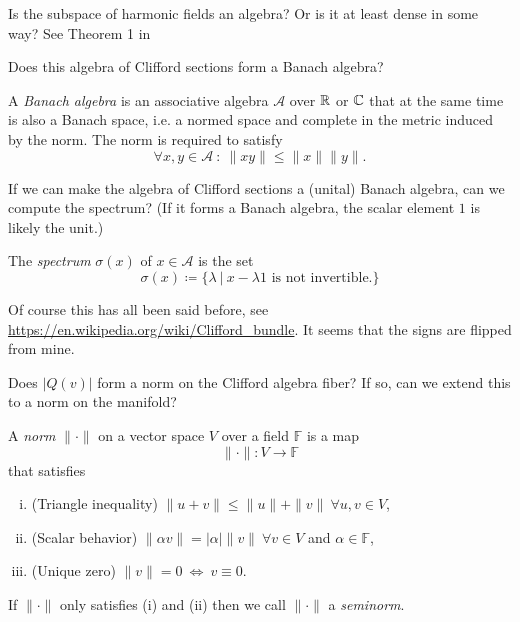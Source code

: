 \begin{question}
Is the subspace of harmonic fields an algebra? Or is it at least dense in some way? See Theorem 1 in \cite{belishev_quaternion}
\end{question}

\begin{question}
Does this algebra of Clifford sections form a Banach algebra?
\end{question}

\begin{definition}
A \emph{Banach algebra} is an associative algebra $\mathcal{A}$ over $\mathbb{R}$ or $\mathbb{C}$ that at the same time is also a Banach space, i.e. a normed space and complete in the metric induced by the norm. The norm is required to satisfy
\[
\forall x,y \in \mathcal{A}~\colon~ \|xy\|\leq \|x\|\|y\|.
\]
\end{definition}

\begin{question}
If we can make the algebra of Clifford sections a (unital) Banach algebra, can we compute the spectrum? (If it forms a Banach algebra, the scalar element $1$ is likely the unit.)
\end{question}

\begin{definition}
The \emph{spectrum} $\sigma(x)$ of $x\in \mathcal{A}$ is the set
\[
\sigma(x) \coloneqq \{ \lambda ~\vert~ x-\lambda 1 \textrm{ is not invertible.}\}
\]
\end{definition}

Of course this has all been said before, see \url{https://en.wikipedia.org/wiki/Clifford_bundle}. It seems that the signs are flipped from mine.

\begin{question}
Does $|Q(v)|$ form a norm on the Clifford algebra fiber? If so, can we extend this to a norm on the manifold?
\end{question}

\begin{definition}
A \emph{norm} $\|\cdot\|$ on a vector space $V$ over a field $\mathbb{F}$ is a map
\[
\|\cdot \| \colon V \to \mathbb{F}
\]
that satisfies
\begin{enumerate}[(i)]
    \item (Triangle inequality) $\|u+v\|\leq \|u\|+\|v\|~\forall u,v\in V$,
    \item (Scalar behavior) $\|\alpha v\| = |\alpha|\|v\|~\forall v\in V$ and $\alpha \in \mathbb{F}$,
    \item (Unique zero) $\|v\|=0 ~\iff~ v\equiv 0$.
\end{enumerate}
If $\|\cdot \|$ only satisfies (i) and (ii) then we call $\|\cdot \|$ a \emph{seminorm}.
\end{definition}

